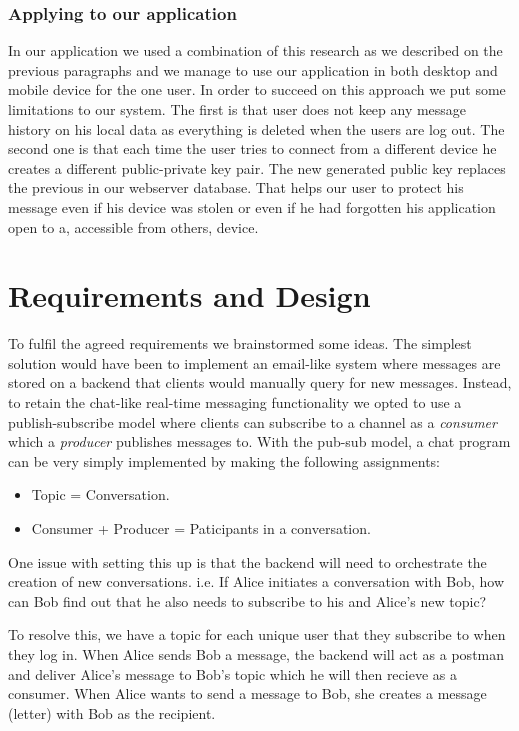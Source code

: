 \documentclass[11pt,a4paper]{report}
\begin{document}
\subsection{Applying to our application}
In our application we used a combination of this research as we described on the previous paragraphs and we manage to use our application in both desktop and mobile device for the one user. In order to succeed on this approach we put some limitations to our system. The first is that user does not keep any message history on his local data as everything is deleted when the users are log out. The second one is that each time the user tries to connect from a different device he creates a different public-private key pair. The new generated public key replaces the previous in our webserver database. That helps our user to protect his message even if his device was stolen or even if he had forgotten his application open to a, accessible from others, device.



\chapter{Requirements and Design}


To fulfil the agreed requirements we brainstormed some ideas. The simplest solution would have been to implement an email-like system where messages are stored on a backend that clients would manually query for new messages. Instead, to retain the chat-like real-time messaging functionality we opted to use a publish-subscribe model where clients can subscribe to a channel as a \emph{consumer} which a \emph{producer} publishes messages to. With the pub-sub model, a chat program can be very simply implemented by making the following assignments:

\begin{itemize}
  \item Topic = Conversation.
  \item Consumer + Producer = Paticipants in a conversation.
\end{itemize}

One issue with setting this up is that the backend will need to orchestrate the creation of new conversations. i.e. If Alice initiates a conversation with Bob, how can Bob find out that he also needs to subscribe to his and Alice's new topic?

To resolve this, we have a topic for each unique user that they subscribe to when they log in. When Alice sends Bob a message, the backend will act as a postman and deliver Alice's message to Bob's topic which he will then recieve as a consumer. When Alice wants to send a message to Bob, she creates a message (letter) with Bob as the recipient.
\end{document}
